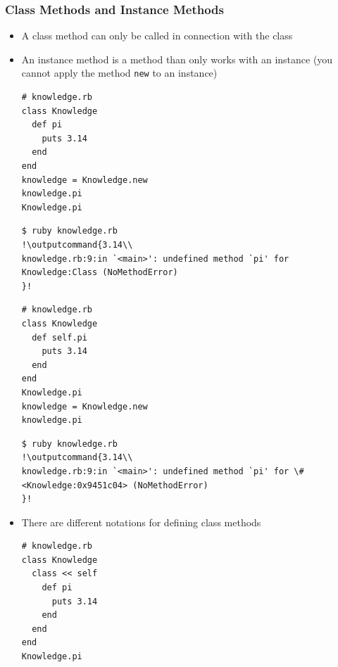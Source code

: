 \documentclass{beamer}
\newcommand{\outputcommand}[1]{\color{darkgreen}{#1}}
\begin{document}
\begin{frame}
\frametitle{Class Methods and Instance Methods}
\begin{itemize}
\item A class method can only be called in connection with the class
\item An instance method is a method than only works with an instance (you cannot apply the method \texttt{new} to an instance)


\lstset{language=Ruby, style=eclipse}
\begin{lstlisting}[escapechar=&]
# knowledge.rb
class Knowledge
  def pi
    puts 3.14
  end
end
knowledge = Knowledge.new
knowledge.pi
Knowledge.pi
\end{lstlisting}

\lstset{language=shell}
\begin{lstlisting}[numbers=none, escapechar=!]
$ ruby knowledge.rb
!\outputcommand{3.14\\
knowledge.rb:9:in `<main>': undefined method `pi' for Knowledge:Class (NoMethodError)
}!
\end{lstlisting}


\lstset{language=Ruby, style=eclipse}
\begin{lstlisting}[escapechar=&]
# knowledge.rb
class Knowledge
  def self.pi
    puts 3.14
  end
end
Knowledge.pi
knowledge = Knowledge.new
knowledge.pi
\end{lstlisting}

\lstset{language=shell}
\begin{lstlisting}[numbers=none, escapechar=!]
$ ruby knowledge.rb
!\outputcommand{3.14\\
knowledge.rb:9:in `<main>': undefined method `pi' for \#<Knowledge:0x9451c04> (NoMethodError)
}!
\end{lstlisting}

\item There are different notations for defining class methods

\lstset{language=Ruby, style=eclipse}
\begin{lstlisting}[escapechar=&]
# knowledge.rb
class Knowledge
  class << self
    def pi
      puts 3.14
    end
  end
end
Knowledge.pi
\end{lstlisting}
\end{itemize}
\end{frame}
\end{document}
